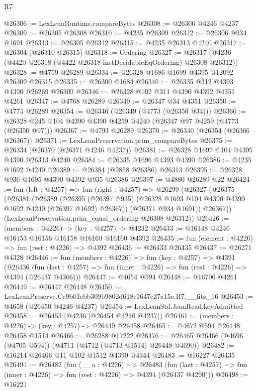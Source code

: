 \begin{lexlean}{R7}
\begin{coremodule}
@26306 := LexLeanRuntime.compareBytes
@26308 := @26306 @4246 @4237
@26309 := @26305 @26308
@26310 := @4235 @26309
@26312 := @26306 @934 @1691
@26313 := @26305 @26312
@26315 := @4235 @26313 @4240
@26317 := @26304 (@26310 @26315)
@26318 := Ordering
@26327 := @26317 (@4236 (@4420 @26318 (@4422 @26318 instDecidableEqOrdering) @26308 @26312))
@26328 := @4759 @26289
@26334 := @26328 @1686 @1699 @4395 @12092 @26309 @26315
@26335 := @26300 @1684
@26340 := @26335 @312 @4393 @4390 @26269 @26309
@26346 := @26328 @102 @311 @4390 @4392 @4351 @4261
@26347 := @4768 @26289
@26349 := @26347 @34 @4351
@26350 := @4774 @26289
@26354 := @26346 (@26349 (@4773 (@26350 @34)))
@26366 := @26328 @245 @104 @4390 @4390 @4259 @4240 (@26347 @97 @4259 (@4773 (@26350 @97)))
@26367 := @4793 @26289
@26370 := @26340 (@26354 (@26366 @26367))
@26371 := LexLeanPreservation.prim_compareBytes
@26375 := @26334 (@26370 (@26371 @4246 @4237))
@26381 := @26328 @1697 @104 @4395 @4390 @26313 @4240
@26384 := @26335 @1696 @4393 @4390
@26386 := @4235 @1692 @4240
@26389 := @26384 (@9858 @26386) @26313
@26395 := @26328 @936 @1695 @4390 @4392 @935 @26386
@26397 := @4880 @26289 @22
@26424 := fun (left : @4257) =>
  fun (right : @4257) =>
  @26299
    (@26327
      (@26375
        (@26381
          (@26389
            (@26395 (@26397 @935) (@26328 @1693 @104 @4390 @4390 @1692 @4240 (@26397 @1692) @26367))
            (@26371 @934 @1691))
          @26367))
      (LexLeanPreservation.prim_equal_ordering @26308 @26312))
@26426 := (members : @4226) -> (key : @4257) -> @4232
@26433 := @16148 @4246 @16153 @16156 @16158 @16160 @16160 @4392
@26435 := fun (element : @4226) => fun (rest : @4226) => @4392
@26436 := @26433 @26435
@26437 := @26271 @4328
@26446 := fun (members : @4226) =>
  fun (key : @4257) =>
  @4391
    (@26436
      (fun (last : @4257) => fun (inner : @4226) => fun (rest : @4226) => @4394 (@26437 @4366)))
@26447 := @4654 @594
@26448 := @16706 @4261
@26449 := @26447 @26448
@26450 := LexLeanPreserve.Ce9b01ebb309b9802d618c1647c27a15e.R7.__fits_16
@26453 := @4658 (@26450 @4246 @4237)
@26454 := LexLeanStd.JsonRead.keyAdmitted
@26458 := @26453 (@4236 (@26454 @4246 @4237))
@26461 := (members : @4226) -> (key : @4257) -> @26449 @26458
@26465 := @4672 @594 @26448 @26458 @1514
@26466 := @26288 @17222
@26476 := @26465 @26466 (@4696 (@4705 @594)) (@4711 (@4712 (@4713 @1514) @26448 @4690))
@26482 := @16214 @26466 @11 @102 @1512 @4390 @4344
@26483 := @16227 @26435
@26491 := @26482
    (fun (__a : @4226) =>
    @26483
      (fun (last : @4257) => fun (inner : @4226) => fun (rest : @4226) => @4394 (@26437 @4290)))
@26498 := @16221

\end{coremodule}
\end{lexlean}
